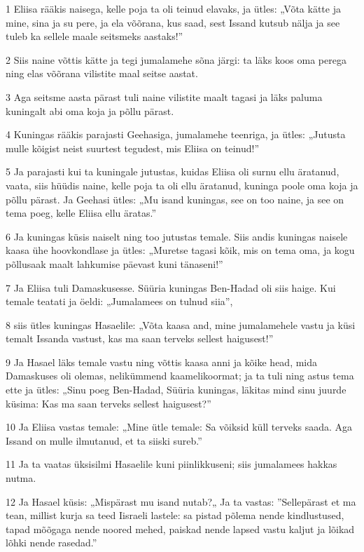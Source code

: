 \par 1 Eliisa rääkis naisega, kelle poja ta oli teinud elavaks, ja ütles: „Võta kätte ja mine, sina ja su pere, ja ela võõrana, kus saad, sest Issand kutsub nälja ja see tuleb ka sellele maale seitsmeks aastaks!”
\par 2 Siis naine võttis kätte ja tegi jumalamehe sõna järgi: ta läks koos oma perega ning elas võõrana vilistite maal seitse aastat.
\par 3 Aga seitsme aasta pärast tuli naine vilistite maalt tagasi ja läks paluma kuningalt abi oma koja ja põllu pärast.
\par 4 Kuningas rääkis parajasti Geehasiga, jumalamehe teenriga, ja ütles: „Jutusta mulle kõigist neist suurtest tegudest, mis Eliisa on teinud!”
\par 5 Ja parajasti kui ta kuningale jutustas, kuidas Eliisa oli surnu ellu äratanud, vaata, siis hüüdis naine, kelle poja ta oli ellu äratanud, kuninga poole oma koja ja põllu pärast. Ja Geehasi ütles: „Mu isand kuningas, see on too naine, ja see on tema poeg, kelle Eliisa ellu äratas.”
\par 6 Ja kuningas küsis naiselt ning too jutustas temale. Siis andis kuningas naisele kaasa ühe hoovkondlase ja ütles: „Muretse tagasi kõik, mis on tema oma, ja kogu põllusaak maalt lahkumise päevast kuni tänaseni!”
\par 7 Ja Eliisa tuli Damaskusesse. Süüria kuningas Ben-Hadad oli siis haige. Kui temale teatati ja öeldi: „Jumalamees on tulnud siia”,
\par 8 siis ütles kuningas Hasaelile: „Võta kaasa and, mine jumalamehele vastu ja küsi temalt Issanda vastust, kas ma saan terveks sellest haigusest!”
\par 9 Ja Hasael läks temale vastu ning võttis kaasa anni ja kõike head, mida Damaskuses oli olemas, nelikümmend kaamelikoormat; ja ta tuli ning astus tema ette ja ütles: „Sinu poeg Ben-Hadad, Süüria kuningas, läkitas mind sinu juurde küsima: Kas ma saan terveks sellest haigusest?”
\par 10 Ja Eliisa vastas temale: „Mine ütle temale: Sa võiksid küll terveks saada. Aga Issand on mulle ilmutanud, et ta siiski sureb.”
\par 11 Ja ta vaatas üksisilmi Hasaelile kuni piinlikkuseni; siis jumalamees hakkas nutma.
\par 12 Ja Hasael küsis: „Mispärast mu isand nutab?„ Ja ta vastas: ”Sellepärast et ma tean, millist kurja sa teed Iisraeli lastele: sa pistad põlema nende kindlustused, tapad mõõgaga nende noored mehed, paiskad nende lapsed vastu kaljut ja lõikad lõhki nende rasedad.”
